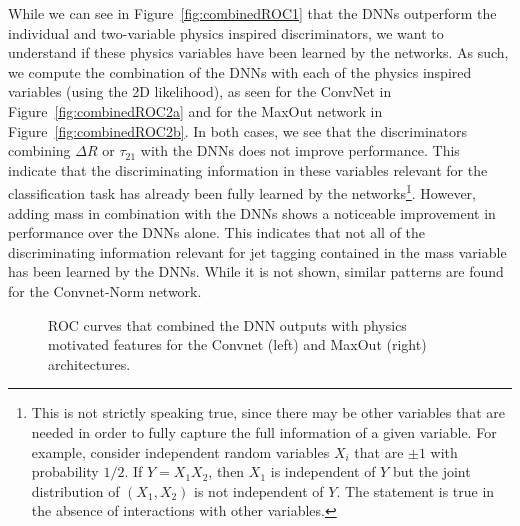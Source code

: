 While we can see in Figure~\ref{fig:combinedROC1} that the DNNs outperform the individual and two-variable physics inspired discriminators, we want to understand if these physics variables have been learned by the networks.  As such, we compute the combination of the DNNs with each of the physics inspired variables (using the 2D likelihood), as seen for the ConvNet in Figure~\ref{fig:combinedROC2a} and for the MaxOut network in Figure~\ref{fig:combinedROC2b}. In both cases, we see that the discriminators combining $\Delta R$ or $\tau_{21}$ with the DNNs does not improve performance.  This indicate that the discriminating information in these variables relevant for the classification task has already been fully learned by the networks\footnote{This is not strictly speaking true, since there may be other variables that are needed in order to fully capture the full information of a given variable.  For example, consider independent random variables $X_i$ that are $\pm 1$ with probability $1/2$.  If $Y=X_1X_2$, then $X_1$ is independent of $Y$ but the joint distribution of $(X_1,X_2)$ is not independent of $Y$.  The statement is true in the absence of interactions with other variables.}.  However, adding mass in combination with the DNNs shows a noticeable improvement in performance over the DNNs alone.  This indicates that not all of the discriminating information relevant for jet tagging contained in the mass variable has been learned by the DNNs.  While it is not shown, similar patterns are found for the Convnet-Norm network.
\begin{figure}[!htbp]
  \begin{center}
\end{center}
  \caption{ROC curves that combined the DNN outputs with physics motivated features for the Convnet (left) and MaxOut (right) architectures.}
  \label{fig:combinedROC2}
\end{figure}

